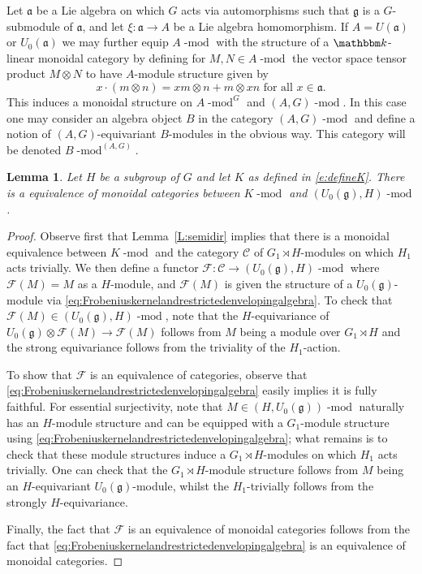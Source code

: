 \documentclass[twoside,12pt,reqno]{amsart}
\newtheorem{Lemma}[Theorem]{Lemma}
\theoremstyle{remark}
\numberwithin{equation}{section}
\def\k{{\mathbbm k}}
\def\lmod{\!\operatorname{-mod}}
\def\g{{\mathfrak g}}
\def\a{\mathfrak{a}}
\def\a{\mathfrak{a}}
\def\cC{\mathcal{C}}
\def\cF{\mathcal{F}}
\begin{document}
Let $\a$ be a Lie algebra on which $G$ acts via automorphisms such that $\g$ is a $G$-submodule of $\a$, and let $\xi:\a\to A$ be a Lie algebra homomorphism. If $A=U(\a)$ or $U_0(\a)$ we may further equip $A\lmod$ with the structure of a $\k$-linear monoidal category by defining for $M,N\in A\lmod$ the vector space tensor product $M\otimes N$ to have $A$-module structure given by $$x\cdot (m\otimes n)=xm\otimes n + m\otimes xn \text{ for all } x\in\a.$$ This induces a monoidal structure on $A\lmod^G$ and $(A,G)\lmod$. In this case one may consider an algebra object $B$ in the category $(A, G)\lmod$ and define a notion of $(A, G)$-equivariant $B$-modules in the obvious way. This category will be denoted $B\lmod^{(A,G)}$.

\begin{Lemma}
\label{L:monoidalequivalence}
    Let $H$ be a subgroup of $G$  and let $K$ as defined in \eqref{e:defineK}. There is a equivalence of monoidal categories between $K\lmod$ and $(U_0(\g),H)\lmod$.
\end{Lemma}

\begin{proof}
    Observe first that Lemma~\ref{L:semidir} implies that there is a monoidal equivalence between $K\lmod$ and the category $\cC$ of $G_1\rtimes H$-modules on which $H_1$ acts trivially. We then define a functor $\cF:\cC\to (U_0(\g),H)\lmod $ where $\cF(M)=M$ as a $H$-module, and $\cF(M)$ is given the structure of a $U_0(\g)$-module via \eqref{eq:Frobeniuskernelandrestrictedenvelopingalgebra}. To check that $\cF(M)\in(U_0(\g),H)\lmod$, note that the $H$-equivariance of $U_0(\g)\otimes\cF(M)\to\cF(M)$ follows from $M$ being a module over $G_1\rtimes H$ and the strong equivariance follows from the triviality of the $H_1$-action.

    To show that $\cF$ is an equivalence of categories, observe that \eqref{eq:Frobeniuskernelandrestrictedenvelopingalgebra} easily implies it is fully faithful. For essential surjectivity, note that $M\in (H,U_0(\g))\lmod$ naturally has an $H$-module structure and can be equipped with a $G_1$-module structure using \eqref{eq:Frobeniuskernelandrestrictedenvelopingalgebra}; what remains is to check that these module structures induce a $G_1\rtimes H$-modules on which $H_1$ acts trivially. One can check that the $G_1\rtimes H$-module structure follows from $M$ being an $H$-equivariant $U_0(\g)$-module, whilst the $H_1$-trivially follows from the strongly $H$-equivariance.

    Finally, the fact that $\cF$ is an equivalence of monoidal categories follows from the fact that \eqref{eq:Frobeniuskernelandrestrictedenvelopingalgebra} is an equivalence of monoidal categories.
\end{proof}
\end{document}
